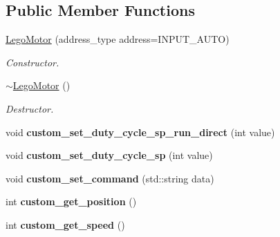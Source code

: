 \subsection*{Public Member Functions}
\begin{DoxyCompactItemize}
\item 
\mbox{\label{classLegoMotor_af87b48e1fc291f34b675c9546c992f1e}} 
\hyperlink{classLegoMotor_af87b48e1fc291f34b675c9546c992f1e}{Lego\+Motor} (address\+\_\+type address=I\+N\+P\+U\+T\+\_\+\+A\+U\+TO)
\begin{DoxyCompactList}\small\item\em Constructor. \end{DoxyCompactList}\item 
\mbox{\label{classLegoMotor_a8fc9c1e059cc34f911a47d97829debec}} 
\hyperlink{classLegoMotor_a8fc9c1e059cc34f911a47d97829debec}{$\sim$\+Lego\+Motor} ()
\begin{DoxyCompactList}\small\item\em Destructor. \end{DoxyCompactList}\item 
\mbox{\label{classLegoMotor_a96949006e4233e6d266499f7e73f6290}} 
void {\bfseries custom\+\_\+set\+\_\+duty\+\_\+cycle\+\_\+sp\+\_\+run\+\_\+direct} (int value)
\item 
\mbox{\label{classLegoMotor_a1e40c2299733fcc1b8473921add4d000}} 
void {\bfseries custom\+\_\+set\+\_\+duty\+\_\+cycle\+\_\+sp} (int value)
\item 
\mbox{\label{classLegoMotor_a08c6475b79acd68a3895853ee2ccd199}} 
void {\bfseries custom\+\_\+set\+\_\+command} (std\+::string data)
\item 
\mbox{\label{classLegoMotor_a16abd3de07fd750303f87c3180ec8e1c}} 
int {\bfseries custom\+\_\+get\+\_\+position} ()
\item 
\mbox{\label{classLegoMotor_ac84f5fe7fcdc0ca732ef446c1ec3c9f6}} 
int {\bfseries custom\+\_\+get\+\_\+speed} ()
\end{DoxyCompactItemize}
